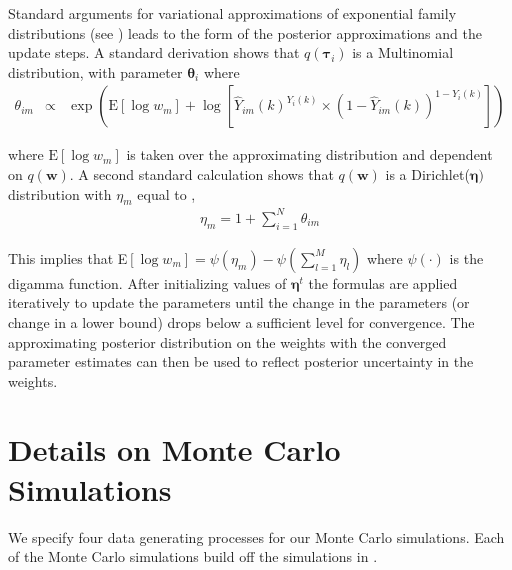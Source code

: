 \documentclass[12pt,letterpaper]{article}
\numberwithin{equation}{section}
\numberwithin{equation}{section}
\begin{document}
Standard arguments for variational approximations of exponential family distributions (see \cite{Jordan99, Bishop06}) leads to the form of the posterior approximations and the update steps.  A standard derivation shows that     $q(\boldsymbol{\tau}_{i})$ is a Multinomial distribution, with parameter $\boldsymbol{\theta}_{i}$ where 
\begin{eqnarray}
\theta_{im} &  \propto  &   \exp\left( \text{E}[\log w_{m} ] +   \log \left[\widehat{Y}_{im}(k)^{Y_{i} (k)} \times (1 - \widehat{Y}_{im}(k))^{1- Y_{i}(k) }\right] \right) \nonumber 
\end{eqnarray}

where $\text{E}[\log w_{m} ]$ is taken over the approximating distribution and dependent on $q(\boldsymbol{w})$.  A second standard calculation shows that $q(\boldsymbol{w})$ is a Dirichlet($\boldsymbol{\eta})$ distribution with $\eta_{m}$ equal to , 
\begin{eqnarray}
\eta_{m}  = 1 + \sum_{i=1}^{N} \theta_{im} \nonumber 
\end{eqnarray}

This implies that E$[\log w_{m} ] = \psi(\eta_{m} )  - \psi\left(\sum_{l=1}^{M} \eta_{l}  \right) $ where $\psi(\cdot)$ is the digamma function.  
After initializing values of $\boldsymbol{\eta}^{t}$ the formulas are applied iteratively to update the parameters until the change in the parameters (or change in a lower bound) drops below a sufficient level for convergence.  The approximating posterior distribution on the weights with the converged parameter estimates can then be used to reflect posterior uncertainty in the weights. 


\section{Details on Monte Carlo Simulations} \label{a:Monte}

We specify four data generating processes for our Monte Carlo simulations. Each of the Monte Carlo simulations build off the simulations in \cite{ImaRat12}.  
\end{document}
